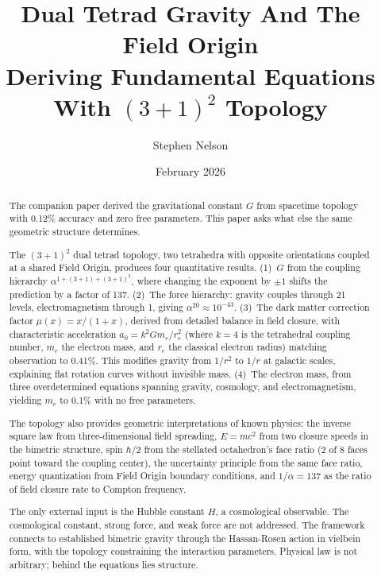 \documentclass[aps,prd,preprint,superscriptaddress,showpacs,preprintnumbers,amsmath,amssymb,nofootinbib]{revtex4-2}
\begin{document}
\raggedbottom

\vspace*{3cm}

\title{Dual Tetrad Gravity And The Field Origin\\
\large Deriving Fundamental Equations With $(3+1)^2$ Topology}

\author{Stephen Nelson}

\date{February 2026}

\begin{abstract}
The companion paper derived the gravitational constant $G$ from spacetime topology with 0.12\% accuracy and zero free parameters. This paper asks what else the same geometric structure determines.

The $(3+1)^2$ dual tetrad topology, two tetrahedra with opposite orientations coupled at a shared Field Origin, produces four quantitative results. (1)~$G$ from the coupling hierarchy $\alpha^{1+(3+1)+(3+1)^2}$, where changing the exponent by $\pm 1$ shifts the prediction by a factor of 137. (2)~The force hierarchy: gravity couples through 21 levels, electromagnetism through 1, giving $\alpha^{20} \approx 10^{-43}$. (3)~The dark matter correction factor $\mu(x) = x/(1+x)$, derived from detailed balance in field closure, with characteristic acceleration $a_0 = k^2 Gm_e/r_e^2$ (where $k = 4$ is the tetrahedral coupling number, $m_e$ the electron mass, and $r_e$ the classical electron radius) matching observation to 0.41\%. This modifies gravity from $1/r^2$ to $1/r$ at galactic scales, explaining flat rotation curves without invisible mass. (4)~The electron mass, from three overdetermined equations spanning gravity, cosmology, and electromagnetism, yielding $m_e$ to 0.1\% with no free parameters.

The topology also provides geometric interpretations of known physics: the inverse square law from three-dimensional field spreading, $E = mc^2$ from two closure speeds in the bimetric structure, spin $\hbar/2$ from the stellated octahedron's face ratio (2 of 8 faces point toward the coupling center), the uncertainty principle from the same face ratio, energy quantization from Field Origin boundary conditions, and $1/\alpha = 137$ as the ratio of field closure rate to Compton frequency.

The only external input is the Hubble constant $H$, a cosmological observable. The cosmological constant, strong force, and weak force are not addressed. The framework connects to established bimetric gravity through the Hassan-Rosen action in vielbein form, with the topology constraining the interaction parameters. Physical law is not arbitrary; behind the equations lies structure.
\end{abstract}
\end{document}
